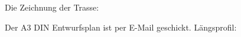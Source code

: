 \documentclass[12pt]{article}
\begin{document}
\newpage 
\noindent Die Zeichnung der Trasse: 
\begin{figure}[ht]\centering
\end{figure}
\newline
Der A3 DIN Entwurfsplan ist per E-Mail geschickt. \newline
Längsprofil: 
\begin{figure}[ht]\centering
\end{figure}
\end{document}
